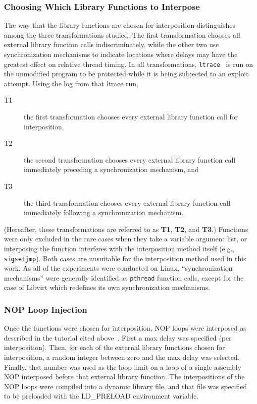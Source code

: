 \subsubsection{Choosing Which Library Functions to Interpose}\label{choosing}
The way that the library functions are chosen for interposition distinguishes among the three transformations studied.
The first transformation chooses all external library function calls indiscriminately, while the other two use synchronization mechanisms to indicate locations where delays may have the greatest effect on relative thread timing.
In all transformations, \texttt{ltrace}~\cite{cespedesltrace} is run on the unmodified program to be protected while it is being subjected to an exploit attempt.
Using the log from that ltrace run,
\begin{description}
	\item[T1] the first transformation chooses every external library function call for interposition,
	\item[T2] the second transformation chooses every external library function call immediately preceding a synchronization mechanism, and
	\item[T3] the third transformation chooses every external library function call immediately following a synchronization mechanism.
\end{description}
(Hereafter, these transformations are referred to as \textbf{T1}, \textbf{T2}, and \textbf{T3}.)
Functions were only excluded in the rare cases when they take a
variable argument list, or interposing the function interferes with the
interposition method itself (e.g., \texttt{sigsetjmp}).
Both cases are unsuitable for the interposition method used in this work.
As all of the experiments were conducted on Linux, ``synchronization
mechanisms'' were generally identified as \texttt{pthread} function calls, except for the case of Libvirt which redefines its own synchronization mechanisms.
\subsubsection{NOP Loop Injection}
Once the functions were chosen for interposition, NOP loops were interposed as described in the tutorial cited above~\cite{Conrod2009}.
First a max delay was specified (per interposition).
Then, for each of the external library functions chosen for interposition, a random integer between zero and the max delay was selected.
Finally, that number was used as the loop limit on a loop of a single assembly NOP interposed before that external library function.
The interpositions of the NOP loops were compiled into a dynamic library file, and that file was specified to be preloaded with the LD\_PRELOAD environment variable.

